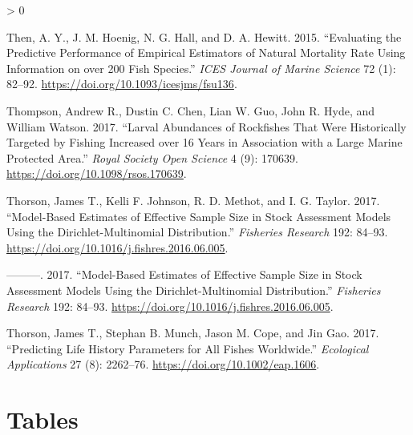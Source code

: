 \documentclass[11pt,
  english,
  a4paper,
]{article}
\newlength{\cslhangindent}
\newenvironment{CSLReferences}[2] %
 {%
  \setlength{\parindent}{0pt}
  \ifodd #1 \everypar{\setlength{\hangindent}{\cslhangindent}}\ignorespaces\fi
  \ifnum #2 > 0
  \setlength{\parskip}{#2\baselineskip}
  \fi
 }%
 {}
\begin{document}
\begin{CSLReferences}{1}{0}
\leavevmode\hypertarget{ref-then_evaluating_2015-1}{}%
Then, A. Y., J. M. Hoenig, N. G. Hall, and D. A. Hewitt. 2015. {``Evaluating the Predictive Performance of Empirical Estimators of Natural Mortality Rate Using Information on over 200 Fish Species.''} \emph{ICES Journal of Marine Science} 72 (1): 82--92. \url{https://doi.org/10.1093/icesjms/fsu136}.

\leavevmode\hypertarget{ref-thompson_larval_2017}{}%
Thompson, Andrew R., Dustin C. Chen, Lian W. Guo, John R. Hyde, and William Watson. 2017. {``Larval Abundances of Rockfishes That Were Historically Targeted by Fishing Increased over 16 Years in Association with a Large Marine Protected Area.''} \emph{Royal Society Open Science} 4 (9): 170639. \url{https://doi.org/10.1098/rsos.170639}.

\leavevmode\hypertarget{ref-thorson_model-based_2017}{}%
Thorson, James T., Kelli F. Johnson, R. D. Methot, and I. G. Taylor. 2017. {``Model-Based Estimates of Effective Sample Size in Stock Assessment Models Using the {Dirichlet}-Multinomial Distribution.''} \emph{Fisheries Research} 192: 84--93. \url{https://doi.org/10.1016/j.fishres.2016.06.005}.

\leavevmode\hypertarget{ref-thorson_model-based_2017}{}%
---------. 2017. {``Model-Based Estimates of Effective Sample Size in Stock Assessment Models Using the {Dirichlet}-Multinomial Distribution.''} \emph{Fisheries Research} 192: 84--93. \url{https://doi.org/10.1016/j.fishres.2016.06.005}.

\leavevmode\hypertarget{ref-thorson_predicting_2017}{}%
Thorson, James T., Stephan B. Munch, Jason M. Cope, and Jin Gao. 2017. {``Predicting Life History Parameters for All Fishes Worldwide.''} \emph{Ecological Applications} 27 (8): 2262--76. \url{https://doi.org/10.1002/eap.1606}.

\end{CSLReferences}

\leavevmode\tagmcend\tagstructend

\clearpage


\hypertarget{tables}{%
\section{Tables}\label{tables}}

\leavevmode\tagmcend\tagstructend


\end{document}
